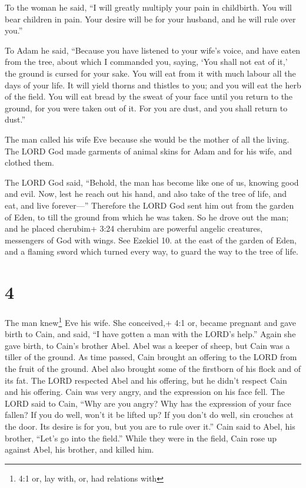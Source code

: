  To the woman he said, ``I will greatly multiply your pain
in childbirth. You will bear children in pain. Your desire will be for
your husband, and he will rule over you.''

 To Adam he said, ``Because you have listened to your
wife's voice, and have eaten from the tree, about which I commanded you,
saying, `You shall not eat of it,' the ground is cursed for your sake.
You will eat from it with much labour all the days of your life.
 It will yield thorns and thistles to you; and you will eat
the herb of the field.  You will eat bread by the sweat of
your face until you return to the ground, for you were taken out of it.
For you are dust, and you shall return to dust.''

 The man called his wife Eve because she would be the
mother of all the living.  The LORD God made garments of
animal skins for Adam and for his wife, and clothed them.

 The LORD God said, ``Behold, the man has become like one
of us, knowing good and evil. Now, lest he reach out his hand, and also
take of the tree of life, and eat, and live forever---'' 
Therefore the LORD God sent him out from the garden of Eden, to till the
ground from which he was taken.  So he drove out the man;
and he placed cherubim+ 3:24 cherubim are powerful angelic creatures,
messengers of God with wings. See Ezekiel 10. at the east of the garden
of Eden, and a flaming sword which turned every way, to guard the way to
the tree of life.

\hypertarget{section-3}{%
\section{4}\label{section-3}}

 The man knew\footnote{4:1 or, lay with, or, had relations
  with} Eve his wife. She conceived,+ 4:1 or, became pregnant and gave
birth to Cain, and said, ``I have gotten a man with the LORD's help.''
 Again she gave birth, to Cain's brother Abel. Abel was a
keeper of sheep, but Cain was a tiller of the ground.  As
time passed, Cain brought an offering to the LORD from the fruit of the
ground.  Abel also brought some of the firstborn of his
flock and of its fat. The LORD respected Abel and his offering,
 but he didn't respect Cain and his offering. Cain was very
angry, and the expression on his face fell.  The LORD said
to Cain, ``Why are you angry? Why has the expression of your face
fallen?  If you do well, won't it be lifted up? If you don't
do well, sin crouches at the door. Its desire is for you, but you are to
rule over it.''  Cain said to Abel, his brother, ``Let's go
into the field.'' While they were in the field, Cain rose up against
Abel, his brother, and killed him.

